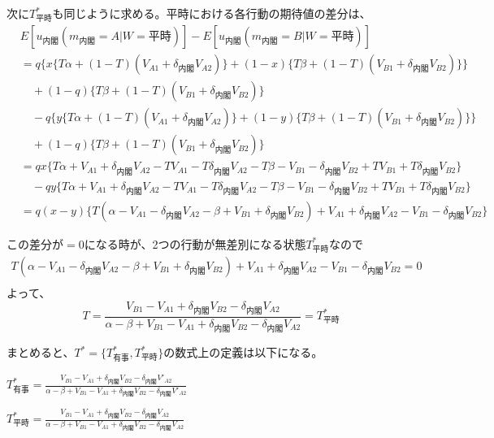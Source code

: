 \documentclass[main.tex]{subfiles}
\begin{document}
次に$T^*_{平時}$も同じように求める。平時における各行動の期待値の差分は、
\begin{align*}
    & E[u_{内閣}(m_{内閣}=A|W=平時)] - E[u_{内閣}(m_{内閣}=B|W=平時)]\\
    & = q\Big\lbrace
        x \lbrace T\alpha + (1-T)(V_{A1} + \delta_{内閣} V_{A2}) \rbrace + (1-x)\lbrace T\beta + (1-T)(V_{B1} + \delta_{内閣} V_{B2}) \rbrace 
        \Big\rbrace\\
    & \quad +(1-q)\lbrace T\beta + (1-T)(V_{B1} + \delta_{内閣} V_{B2}) \rbrace\\
    & \quad - q\Big\lbrace
        y \lbrace T\alpha + (1-T)(V_{A1} + \delta_{内閣} V_{A2}) \rbrace + (1-y)\lbrace T\beta + (1-T)(V_{B1} + \delta_{内閣} V_{B2}) \rbrace
        \Big\rbrace\\
    & \quad +(1-q)\lbrace T\beta + (1-T)(V_{B1} + \delta_{内閣} V_{B2}) \rbrace\\
    & = qx \lbrace T\alpha + V_{A1} + \delta_{内閣}V_{A2} - TV_{A1} - T\delta_{内閣}V_{A2} - T\beta -V_{B1} -\delta_{内閣}V_{B2} + TV_{B1} + T\delta_{内閣}V_{B2} \rbrace\\
    & \quad -qy\lbrace T\alpha + V_{A1} + \delta_{内閣}V_{A2} - TV_{A1} - T\delta_{内閣}V_{A2} - T\beta -V_{B1} -\delta_{内閣}V_{B2} + TV_{B1} + T\delta_{内閣}V_{B2} \rbrace\\
    & = q(x-y)\lbrace T(\alpha -V_{A1} -\delta_{内閣}V_{A2} - \beta + V_{B1} + \delta_{内閣}V_{B2}) + V_{A1} + \delta_{内閣}V_{A2} - V_{B1} - \delta_{内閣}V_{B2}  \rbrace
\end{align*}

\noindent
この差分が$=0$になる時が、2つの行動が無差別になる状態$T^*_{平時}$なので
\begin{gather*}
    T(\alpha -V_{A1} -\delta_{内閣}V_{A2} - \beta + V_{B1} + \delta_{内閣}V_{B2}) + V_{A1} + \delta_{内閣}V_{A2} - V_{B1} - \delta_{内閣}V_{B2} = 0\\
\end{gather*}
よって、
$$T = \frac{ V_{B1} - V_{A1} +\delta_{内閣}V_{B2} - \delta_{内閣}V_{A2} }{ \alpha-\beta + V_{B1}-V_{A1} + \delta_{内閣}V_{B2} - \delta_{内閣}V_{A2} }
= T^*_{平時}$$


まとめると、$T^* = \lbrace T^*_{有事}, T^*_{平時} \rbrace$の数式上の定義は以下になる。
\begin{definition} $T^*_{有事} = \frac{ V_{B1} - V_{A1} +\delta_{内閣}V_{B2} - \delta_{内閣}V'_{A2} }{ \alpha-\beta + V_{B1}-V_{A1} + \delta_{内閣}V_{B2} - \delta_{内閣}V'_{A2} }$ \end{definition}
\begin{definition} $T^*_{平時} = \frac{ V_{B1} - V_{A1} +\delta_{内閣}V_{B2} - \delta_{内閣}V_{A2} }{ \alpha-\beta + V_{B1}-V_{A1} + \delta_{内閣}V_{B2} - \delta_{内閣}V_{A2} }$ \end{definition}
\end{document}
